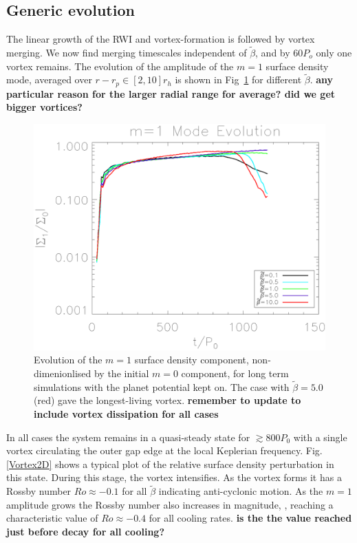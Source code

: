 \subsection{Generic evolution} 
The linear growth of the RWI and vortex-formation is followed by 
vortex merging. We now find merging timescales independent of
$\tilde\beta$, and by $60P_o$ only one vortex remains. 
The evolution of the amplitude of the $m=1$ surface density mode,
averaged over $r-r_p\in[2,10]r_h$ is shown in Fig~\ref{lifetimeplot} 
for different $\tilde\beta$. 
{\bf any particular reason for the larger radial range for average?
  did we get bigger vortices?} 

\begin{figure}
  \includegraphics[width=\linewidth,clip=true,trim=0.5cm
  0cm 0cm 1cm]{figures/longterm_stability}
  \caption{Evolution of the $m=1$ surface density component,
    non-dimenionlised by the initial $m=0$ component, for long term
    simulations with the planet potential kept on. The case with 
    $\tilde\beta=5.0$ (red) gave the longest-living vortex. {\bf
      remember to update to 
      include vortex dissipation for all cases} \label{lifetimeplot}} 
\end{figure}

In all cases the system remains in a quasi-steady state for
$\gtrsim800P_0$ with a single vortex circulating 
the outer gap edge at the local Keplerian  
frequency. Fig. \ref{Vortex2D} shows a typical plot of the relative 
surface density perturbation in this state. During this stage, the 
vortex intensifies. As the vortex forms it has a
Rossby number $Ro\approx-0.1$ for all $\tilde\beta$
indicating anti-cyclonic
motion. As the $m=1$ amplitude grows the Rossby number also increases
in magnitude, 
, reaching a characteristic value of $Ro\approx-0.4$ for all cooling
rates. {\bf is the the value reached just before decay for all cooling?}

